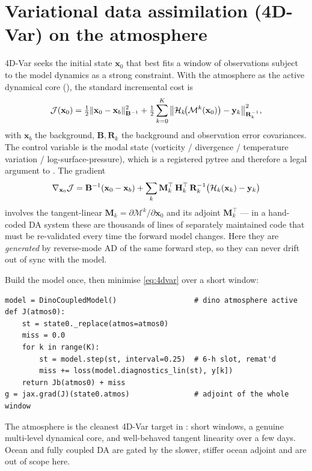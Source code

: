 \section{Variational data assimilation (4D-Var) on the atmosphere}

4D-Var seeks the initial state $\mathbf{x}_0$ that best fits a window of
observations subject to the model dynamics as a strong constraint. With the
\dino{} atmosphere as the active dynamical core
(), the standard incremental cost is
\begin{equation}
  \mathcal{J}(\mathbf{x}_0) =
  \tfrac12 \lVert \mathbf{x}_0 - \mathbf{x}_b \rVert^{2}_{\mathbf{B}^{-1}}
  + \tfrac12 \sum_{k=0}^{K}
    \big\lVert \mathcal{H}_k\!\big(\mathcal{M}^{k}(\mathbf{x}_0)\big) - \mathbf{y}_k
    \big\rVert^{2}_{\mathbf{R}_k^{-1}},
  \label{eq:4dvar}
\end{equation}
with $\mathbf{x}_b$ the background, $\mathbf{B},\mathbf{R}_k$ the background and
observation error covariances. The control variable is the modal \dino{} state
(vorticity / divergence / temperature variation / log-surface-pressure), which is
a registered \jax{} pytree and therefore a legal argument to . The
gradient
\begin{equation}
  \nabla_{\mathbf{x}_0}\mathcal{J}
  = \mathbf{B}^{-1}(\mathbf{x}_0-\mathbf{x}_b)
  + \sum_k \mathbf{M}_k^{\top}\,\mathbf{H}_k^{\top}\,\mathbf{R}_k^{-1}
    \big(\mathcal{H}_k(\mathbf{x}_k)-\mathbf{y}_k\big)
  \label{eq:4dvargrad}
\end{equation}
involves the tangent-linear $\mathbf{M}_k=\partial\mathcal{M}^{k}/\partial\mathbf{x}_0$
and its adjoint $\mathbf{M}_k^{\top}$ --- in a hand-coded DA system these are
thousands of lines of separately maintained code that must be re-validated every
time the forward model changes. Here they are \emph{generated} by reverse-mode AD
of the same forward step, so they can never drift out of sync with the model.
\begin{example}
Build the model once, then minimise \eqref{eq:4dvar} over a short window:
\begin{lstlisting}[style=chronos]
model = DinoCoupledModel()                  # dino atmosphere active
def J(atmos0):
    st = state0._replace(atmos=atmos0)
    miss = 0.0
    for k in range(K):
        st = model.step(st, interval=0.25)  # 6-h slot, remat'd
        miss += loss(model.diagnostics_lin(st), y[k])
    return Jb(atmos0) + miss
g = jax.grad(J)(state0.atmos)               # adjoint of the whole window
\end{lstlisting}
The atmosphere is the cleanest 4D-Var target in \model{}: short windows, a
genuine multi-level dynamical core, and well-behaved tangent linearity over a few
days. Ocean and fully coupled DA are gated by the slower, stiffer ocean adjoint
and are out of scope here.
\end{example}

